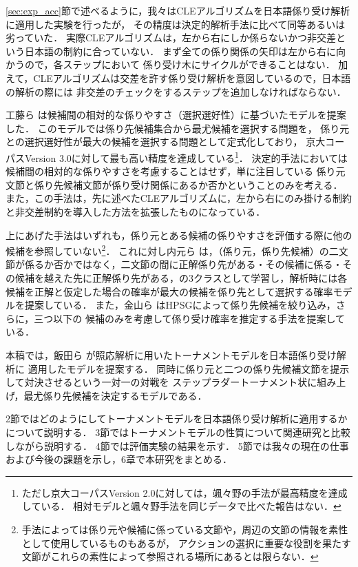 \documentclass[japanese]{jnlp_1.4}
\begin{document}
\ref{sec:exp_acc}節で述べるように，我々はCLEアルゴリズムを日本語係り受け解析に適用した実験を行ったが，
その精度は決定的解析手法に比べて同等あるいは劣っていた．
実際CLEアルゴリズムは，左から右にしか係らないかつ非交差という日本語の制約に合っていない．
まず全ての係り関係の矢印は左から右に向かうので，各ステップにおいて
係り受け木にサイクルができることはない．
加えて，CLEアルゴリズムは交差を許す係り受け解析を意図しているので，日本語の解析の際には
非交差のチェックをするステップを追加しなければならない．


工藤ら  は候補間の相対的な係りやすさ（選択選好性）に基づいたモデルを提案した．
このモデルでは係り先候補集合から最尤候補を選択する問題を，
係り元との選択選好性が最大の候補を選択する問題として定式化しており，
京大コーパスVersion 3.0に対して最も高い精度を達成している\footnote{
	ただし京大コーパスVersion 2.0に対しては，颯々野の手法が最高精度を達成している．
	相対モデルと颯々野手法を同じデータで比べた報告はない．}．
決定的手法においては候補間の相対的な係りやすさを考慮することはせず，単に注目している
係り元文節と係り先候補文節が係り受け関係にあるか否かということのみを考える．
また，この手法は，先に述べたCLEアルゴリズムに，左から右にのみ掛ける制約と非交差制約を導入した方法を拡張したものになっている．

上にあげた手法はいずれも，係り元とある候補の係りやすさを評価する際に他の候補を参照していない\footnote{
	手法によっては係り元や候補に係っている文節や，周辺の文節の情報を素性として使用しているものもあるが，
	アクションの選択に重要な役割を果たす文節がこれらの素性によって参照される場所にあるとは限らない．}．
これに対し内元ら は，（係り元，係り先候補）の二文節が係るか否かではなく，二文節の間に正解係り先がある・その候補に係る・その候補を越えた先に正解係り先がある，の3クラスとして学習し，解析時には各候補を正解と仮定した場合の確率が最大の候補を係り先として選択する確率モデルを提案している．
また，金山ら  はHPSGによって係り先候補を絞り込み，さらに，三つ以下の
候補のみを考慮して係り受け確率を推定する手法を提案している．


本稿では，飯田ら  が照応解析に用いたトーナメントモデルを日本語係り受け解析に
適用したモデルを提案する．
同時に係り元と二つの係り先候補文節を提示して対決させるという一対一の対戦を
ステップラダートーナメント状に組み上げ，最尤係り先候補を決定するモデルである．

2節ではどのようにしてトーナメントモデルを日本語係り受け解析に適用するかについて説明する．
3節ではトーナメントモデルの性質について関連研究と比較しながら説明する．
4節では評価実験の結果を示す．
5節では我々の現在の仕事および今後の課題を示し，6章で本研究をまとめる．
\end{document}

